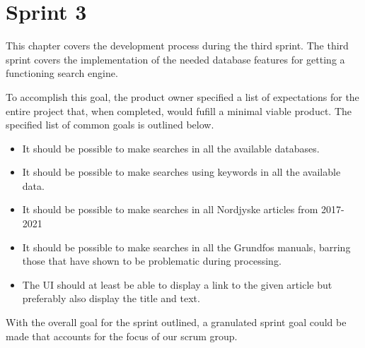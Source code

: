 \chapter{Sprint 3}

This chapter covers the development process during the third sprint. The third sprint covers the implementation of the needed database features for getting a functioning search engine. 


To accomplish this goal, the product owner specified a list of expectations for the entire \knox{} project that, when completed, would fufill a minimal viable product. The specified list of common goals is outlined below.
\begin{itemize}
	\item It should be possible to make searches in all the available databases.
	\item It should be possible to make searches using keywords in all the available data.
	\item It should be possible to make searches in all Nordjyske articles from 2017-2021
	\item It should be possible to make searches in all the Grundfos manuals, barring those that have shown to be problematic during processing.
	\item The UI should at least be able to display a link to the given article but preferably also display the title and text.
\end{itemize}

With the overall goal for the sprint outlined, a granulated sprint goal could be made that accounts for the focus of our scrum group.






